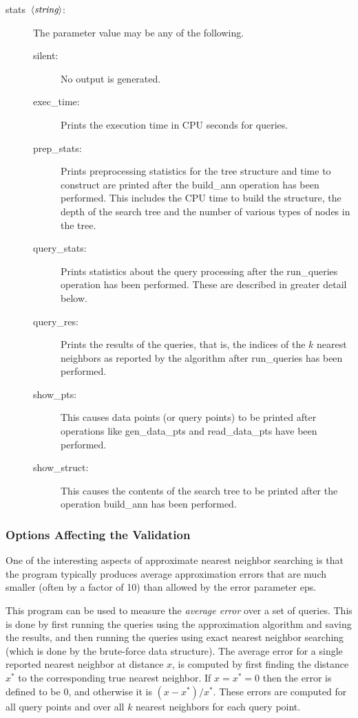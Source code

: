 \documentclass[11pt]{article}		%
\newcommand\ang[1]{\langle #1\rangle}
\newcommand{\STRING}[0]{$\ang{\textit{string}\/}$}
\begin{document}
\begin{description}
\item[\hbox{\sf stats \STRING:}]  The parameter value may be any of the
	following.
	\begin{description}
	\item[\hbox{\sf silent:}] No output is generated.
	\item[\hbox{\sf exec\_time:}] Prints the execution time in CPU seconds
		for queries.
	\item[\hbox{\sf prep\_stats:}]
		Prints preprocessing statistics for the tree structure
		and time to construct are printed after the \textsf{build\_ann}
		operation has been performed.  This includes the CPU time
		to build the structure, the depth of the search tree and
		the number of various types of nodes in the tree.
	\item[\hbox{\sf query\_stats:}]
		Prints statistics about the query processing after the
		\textsf{run\_queries} operation has been performed.  These
		are described in greater detail below.
	\item[\hbox{\sf query\_res:}]
		Prints the results of the queries, that is, the indices
		of the $k$ nearest neighbors as reported by the algorithm
		after \textsf{run\_queries} has been performed.
	\item[\hbox{\sf show\_pts:}]
		This causes data points (or query points) to be printed after
		operations like \textsf{gen\_data\_pts} and \textsf{read\_data\_pts}
		have been performed.
	\item[\hbox{\sf show\_struct:}]
		This causes the contents of the search tree to be printed
		after the operation \textsf{build\_ann} has been performed.
	\end{description}
\end{description}

\subsubsection{Options Affecting the Validation}

One of the interesting aspects of approximate nearest neighbor searching
is that the program typically produces average approximation errors that
are much smaller (often by a factor of 10) than allowed by the error
parameter \textsf{eps}.

This program can be used to measure the \emph{average error} over a set of
queries.  This is done by first running the queries using the approximation
algorithm and saving the results, and then running the queries using exact
nearest neighbor searching (which is done by the brute-force data structure).
The average error for a single reported nearest neighbor at distance $x$,
is computed by first finding the distance $x^*$ to the corresponding true
nearest neighbor.  If $x=x^*=0$ then the error is defined to be 0, and
otherwise it is $(x - x^*)/x^*$.  These errors are computed for all query
points and over all $k$ nearest neighbors for each query point.
\end{document}
